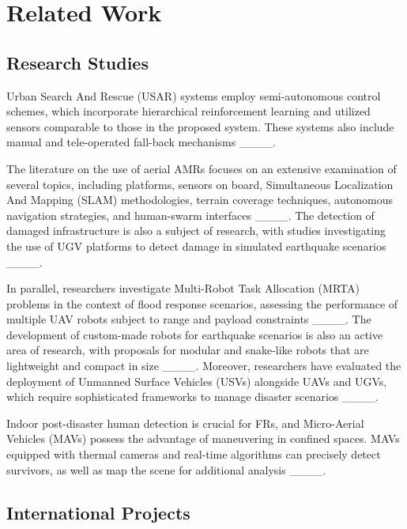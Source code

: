 \section{Related Work}
\label{sec:related-work}

\subsection{Research Studies}

Urban Search And Rescue (USAR) systems employ semi-autonomous control schemes, which incorporate hierarchical reinforcement learning and utilized sensors comparable to those in the proposed system. These systems also include manual and tele-operated fall-back mechanisms ____.

The literature on the use of aerial AMRs focuses on an extensive examination of several topics, including platforms, sensors on board, Simultaneous Localization And Mapping (SLAM) methodologies, terrain coverage techniques, autonomous navigation strategies, and human-swarm interfaces ____. The detection of damaged infrastructure is also a subject of research, with studies investigating the use of UGV platforms to detect damage in simulated earthquake scenarios ____.

In parallel, researchers investigate Multi-Robot Task Allocation (MRTA) problems in the context of flood response scenarios, assessing the performance of multiple UAV robots subject to range and payload constraints ____. The development of custom-made robots for earthquake scenarios is also an active area of research, with proposals for modular and snake-like robots that are lightweight and compact in size ____. Moreover, researchers have evaluated the deployment of Unmanned Surface Vehicles (USVs) alongside UAVs and UGVs, which require sophisticated frameworks to manage disaster scenarios ____.

Indoor post-disaster human detection is crucial for FRs, and Micro-Aerial Vehicles (MAVs) possess the advantage of maneuvering in confined spaces. MAVs equipped with thermal cameras and real-time algorithms can precisely detect survivors, as well as map the scene for additional analysis ____.

\subsection{International Projects}

